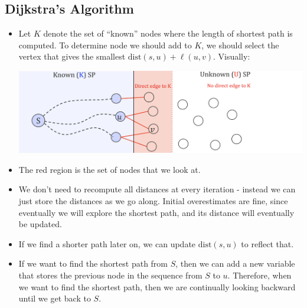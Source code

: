 \documentclass[10pt]{article}
\newcommand{\dist}{\mathrm{dist}}
\begin{document}
	\subsection{Dijkstra's Algorithm}
	\begin{itemize}
		\item Let $K$ denote the set of ``known'' nodes where the length of shortest path is computed. To 
			determine node we should add to $K$, we should select the vertex that gives the smallest 
			$\dist(s, u) + \ell(u, v)$. Visually:
			\begin{center}
				\includegraphics[scale=0.5]{dijkstra.png}
			\end{center}
		\item The red region is the set of nodes that we look at.
		\item We don't need to recompute all distances at every iteration - instead we can just store 
			the distances as we go along. Initial overestimates are fine, since eventually we will explore 
			the shortest path, and its distance will eventually be updated. 
		\item If we find a shorter path later on, we can update $\dist(s, u)$ to reflect that.
		\item If we want to find the shortest path from $S$, then we can add a new variable that stores 
			the previous node in the sequence from $S$ to $u$. Therefore, when we want to find the 
			shortest path, then we are continually looking backward until we get back to $S$. 
	\end{itemize}
\end{document}
